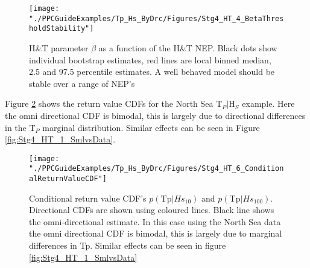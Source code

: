 \begin{figure}
	\centering
	\texttt{[image: "./PPCGuideExamples/Tp\_Hs\_ByDrc/Figures/Stg4\_HT\_4\_BetaThresholdStability"]}
	\caption{H\&T parameter $\beta$ as a function of the H\&T NEP. Black dots show individual bootstrap estimates, red lines are local binned median, 2.5 and 97.5 percentile estimates. A well behaved model should be stable over a range of NEP's}
	\label{fig:Stg4_HT_4_BetaThresholdStability}
\end{figure}

 Figure \ref{fig:Stg4_HT_6_ConditionalReturnValueCDF} shows the return value CDFs for the North Sea T$_P$$|$H$_S$ example. Here the omni directional CDF is bimodal, this is largely due to directional differences in the T$_P$ marginal distribution. Similar effects can be seen in Figure \ref{fig:Stg4_HT_1_SmlvsData}.


\begin{figure}
	\centering
	\texttt{[image: "./PPCGuideExamples/Tp\_Hs\_ByDrc/Figures/Stg4\_HT\_6\_ConditionalReturnValueCDF"]}
	\caption{Conditional return value CDF's $p(\textrm{Tp} | Hs_{10})$ and $p(\textrm{Tp} | Hs_{100})$. Directional CDFs are shown using coloured lines. Black line shows the omni-directional estimate. In this case using the North Sea data the omni directional CDF is bimodal, this is largely due to marginal differences in Tp. Similar effects can be seen in figure \ref{fig:Stg4_HT_1_SmlvsData}}
	\label{fig:Stg4_HT_6_ConditionalReturnValueCDF}
\end{figure}

\newpage